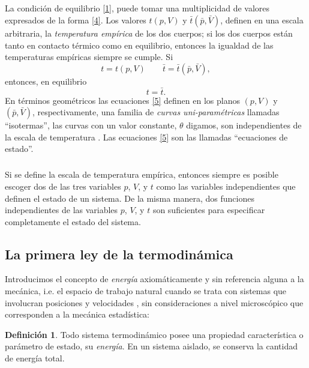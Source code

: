 \documentclass{article}
\theoremstyle{definition} \newtheorem{defi}{Definici\'on}
\theoremstyle{definition} \newtheorem{teo}{Teorema}
\theoremstyle{definition} \newtheorem{cor}{Corolario}
\begin{document}
\subparagraph{}
La condici\'on de equilibrio \eqref{1}, puede tomar una multiplicidad de valores expresados de la forma \eqref{4}. Los valores $t(p,V)$ y $\bar{t}(\bar{p},\bar{V})$, definen en una escala arbitraria, la \emph{temperatura emp\'irica} de los dos cuerpos; si los dos cuerpos est\'an tanto en contacto t\'ermico como en equilibrio, entonces la igualdad de las temperaturas emp\'iricas siempre se cumple. Si
\begin{equation}\label{5}
t=t(p,V) \qquad \bar{t}=\bar{t}(\bar{p},\bar{V}),
\end{equation}
entonces, en equilibrio
\begin{equation}
t=\bar{t}.
\end{equation}
En t\'erminos geom\'etricos las ecuaciones \eqref{5} definen en los planos $(p,V)$ y $(\bar{p},\bar{V})$, respectivamente, una familia de \emph{curvas uni-param\'etricas} llamadas ``isotermas'', las curvas con un valor constante, $\theta$ digamos, son independientes de la escala de temperatura \cite{MB}. Las ecuaciones \eqref{5} son las llamadas ``ecuaciones de estado''.
\subparagraph{}
Si se define la escala de temperatura emp\'irica, entonces siempre es posible escoger dos de las tres variables $p$, $V$, y $t$ como las variables independientes que definen el estado de un sistema. De la misma manera, dos funciones independientes de las variables $p$, $V$, y $t$ son suficientes para especificar completamente el estado del sistema.
\subsection{La primera ley de la termodin\'amica}
Introducimos el concepto de \emph{energ\'ia} axiom\'aticamente y sin referencia alguna a la mec\'anica, i.e. el espacio de trabajo natural cuando se trata con sistemas que involucran posiciones y velocidades \cite{MC}, sin consideraciones a nivel microsc\'opico que corresponden a la mec\'anica estad\'istica:
\begin{defi}
Todo sistema termodin\'amico posee una propiedad caracter\'istica o par\'ametro de estado, su \emph{energ\'ia}. En un sistema aislado, se conserva la cantidad de energ\'ia total.
\end{defi}
\end{document}
